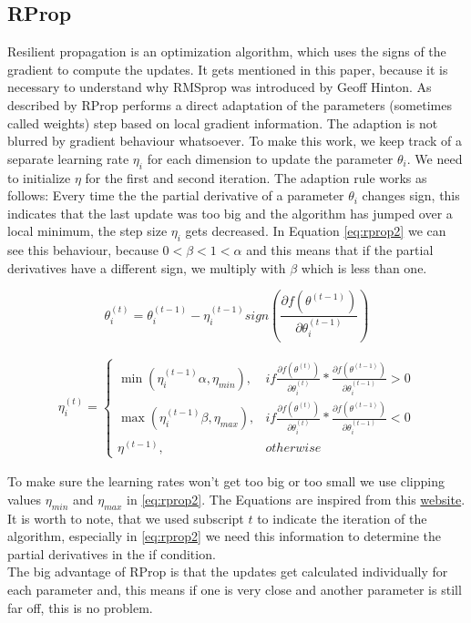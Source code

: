 \documentclass[aodsor,preprint]{imsart}
\numberwithin{equation}{section}
\theoremstyle{plain}
\begin{document}
\subsection{RProp}
Resilient propagation is an optimization algorithm, which uses the signs of the gradient to compute the updates. It gets mentioned in this paper, because it is necessary to understand why RMSprop was introduced by Geoff Hinton. As described by \cite{RiedmillerM1993Adam} RProp performs a direct adaptation of the parameters (sometimes called weights) step based on local gradient information. The adaption is not blurred by gradient behaviour whatsoever. To make this work, we keep track of a separate learning rate $\eta_{i}$ for each dimension to update the parameter $\theta_{i}$. We need to initialize $\eta$ for the first and second iteration. The adaption rule works as follows: Every time the the partial derivative of a parameter $\theta_{i}$ changes sign, this indicates that the last update was too big and the algorithm has jumped over a local minimum, the step size $\eta_{i}$ gets decreased. In Equation \ref{eq:rprop2} we can see this behaviour, because $0<\beta<1<\alpha$ and this means that if the partial derivatives have a different sign, we multiply with $\beta$ which is less than one.

\begin{equation} \label{eq:rprop1}
\theta_{i}^{(t)} = \theta_{i}^{(t-1)} - \eta_{i}^{(t-1)}sign\left(\frac{\partial f(\theta^{(t-1)})}{\partial \theta_{i}^{(t-1)}} \right)
\end{equation}


\begin{align} \label{eq:rprop2}
\eta_{i}^{(t)} = \left\{ 
	\begin{array}{ll}
		\min{(\eta_{i}^{(t-1)}\alpha, \eta_{min})},& if \frac{\partial f(\theta^{(t)})}{\partial \theta_{i}^{(t)}} * \frac{\partial f(\theta^{(t-1)})}{\partial \theta_{i}^{(t-1)}} > 0\\
		\max{(\eta_{i}^{(t-1)}\beta, \eta_{max})}, & if \frac{\partial f(\theta^{(t)})}{\partial \theta_{i}^{(t)}} * \frac{\partial f(\theta^{(t-1)})}{\partial \theta_{i}^{(t-1)}} < 0\\
		\eta^{(t-1)}, & otherwise
	\end{array}		
\right.
\end{align}

To make sure the learning rates won't get too big or too small we use clipping values $\eta_{min}$ and $\eta_{max}$ in \ref{eq:rprop2}. The Equations are inspired from this \href{https://florian.github.io/rprop/}{website}. It is worth to note, that we used subscript $t$ to indicate the iteration of the algorithm, especially in \ref{eq:rprop2} we need this information to determine the partial derivatives in the if condition. \\
The big advantage of RProp is that the updates get calculated individually for each parameter and, this means if one is very close and another parameter is still far off, this is no problem. 
\end{document}
